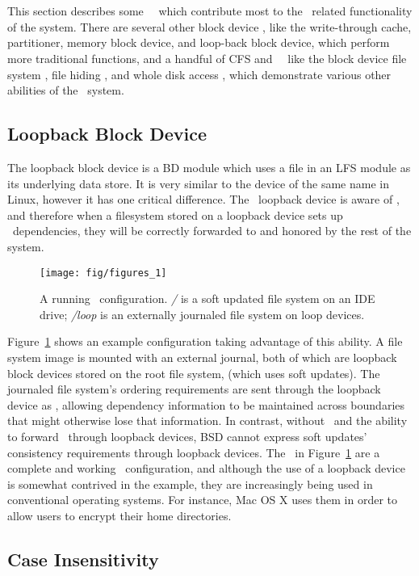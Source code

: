 \section{\Modules}
\label{sec:modules}

This section describes some \Kudos\ \modules\ which contribute most to
the \chdesc\ related functionality of the system. There are several other
block device \modules, like the write-through cache, partitioner, memory
block device, and loop-back block device, which perform more traditional
functions, and a handful of CFS and \LFS\ \modules\ like the block device
file system \module, file hiding \module, and whole disk access \module,
which demonstrate various other abilities of the \module\ system.





\subsection{Loopback Block Device}
\label{sec:modules:loop}

The loopback block device is a BD module which uses a file in an LFS module as
its underlying data store. It is very similar to the device of the same name in
Linux, however it has one critical difference. The \Kudos\ loopback device is
aware of \chdescs, and therefore when a filesystem stored on a loopback device
sets up \chdesc\ dependencies, they will be correctly forwarded to and honored
by the rest of the system.

\begin{figure}[htb]
  \centering
  \texttt{[image: fig/figures\_1]}
  \caption{A running \Kudos\ configuration. {\it/} is a soft updated
    file system on an IDE drive; {\it/loop} is an externally journaled
    file system on loop devices.}
  \label{fig:kfs-graph}
\end{figure}

Figure~\ref{fig:kfs-graph} shows an example configuration taking advantage of
this ability. A file system image is mounted with an external journal, both of
which are loopback block devices stored on the root file system, (which uses
soft updates). The journaled file system's ordering requirements are sent
through the loopback device as \chdescs, allowing dependency information to be
maintained across boundaries that might otherwise lose that information. In
contrast, without \chdescs\ and the ability to forward \chdescs\ through
loopback devices, BSD cannot express soft updates' consistency requirements
through loopback devices. The \modules\ in Figure~\ref{fig:kfs-graph} are a
complete and working \Kudos\ configuration, and although the use of a loopback
device is somewhat contrived in the example, they are increasingly being used in
conventional operating systems. For instance, Mac OS X uses them in order to
allow users to encrypt their home directories.

\subsection{Case Insensitivity}
\label{sec:modules:icase}

